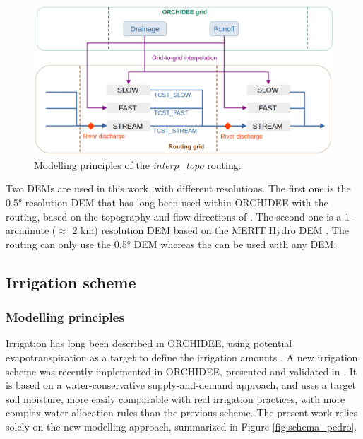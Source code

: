 \begin{figure}[ht]
    \centering
    \includegraphics[width=1\textwidth]{images/methods/routing_principles.png}
    \caption{Modelling principles of the \textit{interp\_topo} routing.}
    \label{fig:routing_principles}
\end{figure}

Two DEMs are used in this work, with different resolutions. 
The first one is the 0.5° resolution DEM that has long been used within ORCHIDEE with the \std routing, based on the topography and flow directions of \citet{vorosmarty_geomorphometric_2000}.
The second one is a 1-arcminute ($\approx$ 2 km) resolution DEM based on the MERIT Hydro DEM \citep{yamazaki_merit_2019}.
The \std routing can only use the 0.5° DEM whereas the \native can be used with any DEM.


\subsection{Irrigation scheme}
\subsubsection{Modelling principles}

Irrigation has long been described in ORCHIDEE, using potential evapotranspiration as a target to define the irrigation amounts \citep{de_rosnay_integrated_2003, guimberteau_global_2012}. A new irrigation scheme was recently implemented in ORCHIDEE, presented and validated in \citet{arboleda-obando_validation_2024}. It is based on a water-conservative supply-and-demand approach, and uses a target soil moisture, more easily comparable with real irrigation practices, with more complex water allocation rules than the previous scheme. The present work relies solely on the new modelling approach, summarized in Figure \ref{fig:schema_pedro}.


